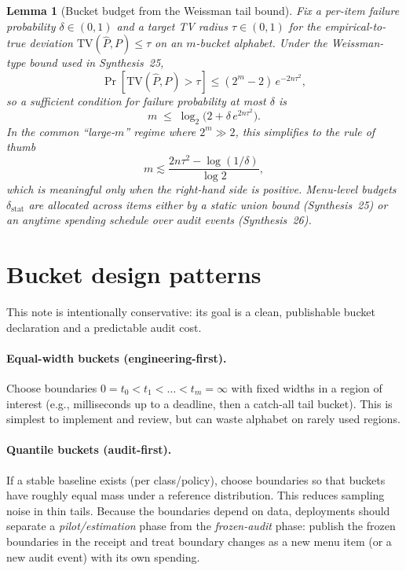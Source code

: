 \documentclass[11pt]{article}
\newtheorem{lemma}{Lemma}
\newcommand{\TV}{\mathrm{TV}}
\begin{document}
\begin{lemma}[Bucket budget from the Weissman tail bound]\label{lem:mbudget}
Fix a per-item failure probability $\delta\in(0,1)$ and a target TV radius $\tau\in(0,1)$
for the empirical-to-true deviation $\TV(\widehat P,P)\le \tau$ on an $m$-bucket alphabet.
Under the Weissman-type bound used in Synthesis~25,
\[
\Pr[\TV(\widehat P,P)>\tau]\le (2^m-2)\,e^{-2n\tau^2},
\]
so a sufficient condition for failure probability at most $\delta$ is
\[
m\;\le\;\log_2\!\bigl(2+\delta\,e^{2n\tau^2}\bigr).
\]
In the common ``large-$m$'' regime where $2^m\gg 2$, this simplifies to the rule of thumb
\[
m \lesssim \frac{2n\tau^2-\log(1/\delta)}{\log 2},
\]
which is meaningful only when the right-hand side is positive.
Menu-level budgets $\delta_{\mathrm{stat}}$ are allocated across items either by a static union bound (Synthesis~25)
or an anytime spending schedule over audit events (Synthesis~26).\cite{series:anytimespend}
\end{lemma}

\section{Bucket design patterns}
This note is intentionally conservative: its goal is a clean, publishable bucket declaration and a predictable audit cost.

\paragraph{Equal-width buckets (engineering-first).}
Choose boundaries $0=t_0<t_1<\dots<t_m=\infty$ with fixed widths in a region of interest
(e.g., milliseconds up to a deadline, then a catch-all tail bucket).
This is simplest to implement and review, but can waste alphabet on rarely used regions.

\paragraph{Quantile buckets (audit-first).}
If a stable baseline exists (per class/policy), choose boundaries so that buckets have roughly equal mass under a reference distribution.
This reduces sampling noise in thin tails.
Because the boundaries depend on data, deployments should separate a \emph{pilot/estimation} phase from the \emph{frozen-audit} phase:
publish the frozen boundaries in the receipt and treat boundary changes as a new menu item (or a new audit event) with its own spending. \cite{series:anytimespend}
\end{document}
